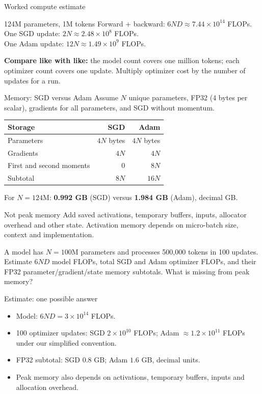 \documentclass[handout]{beamer}
\begin{document}
\begin{frame}{Worked compute estimate}
  \begin{block}{124M parameters, 1M tokens}
    Forward + backward: $6ND\approx 7.44\times10^{14}$ FLOPs.\\[6pt]
    One SGD update: $2N\approx 2.48\times10^8$ FLOPs.\\[6pt]
    One Adam update: $12N\approx 1.49\times10^9$ FLOPs.
  \end{block}
  \vfill
  \textbf{Compare like with like:} the model count covers one million tokens; each optimizer count covers one update. Multiply optimizer cost by the number of updates for a run.
\end{frame}

\begin{frame}{Memory: SGD versus Adam}
  \small
  Assume $N$ unique parameters, FP32 (4 bytes per scalar), gradients for all parameters, and SGD without momentum.
  \vspace{4pt}
  \begin{center}
    \begin{tabular}{lrr}
      \toprule
      Storage & SGD & Adam \\
      \midrule
      Parameters & $4N$ bytes & $4N$ bytes \\
      Gradients & $4N$ & $4N$ \\
      First and second moments & 0 & $8N$ \\
      \midrule
      Subtotal & $8N$ & $16N$ \\
      \bottomrule
    \end{tabular}
  \end{center}
  For $N=124$M: \textbf{0.992 GB} (SGD) versus \textbf{1.984 GB} (Adam), decimal GB.
  \begin{alertblock}{Not peak memory}
    Add saved activations, temporary buffers, inputs, allocator overhead and other state. Activation memory depends on micro-batch size, context and implementation.
  \end{alertblock}
\end{frame}

{A model has $N=100$M parameters and processes 500,000 tokens in 100 updates. Estimate $6ND$ model FLOPs, total SGD and Adam optimizer FLOPs, and their FP32 parameter/gradient/state memory subtotals. What is missing from peak memory?}

\begin{frame}{Estimate: one possible answer}
  \begin{itemize}
      \setlength{\itemsep}{9pt}
    \item Model: $6ND=3\times10^{14}$ FLOPs.
    \item 100 optimizer updates: SGD $2\times10^{10}$ FLOPs; Adam $\approx1.2\times10^{11}$ FLOPs under our simplified convention.
    \item FP32 subtotal: SGD $0.8$ GB; Adam $1.6$ GB, decimal units.
    \item Peak memory also depends on activations, temporary buffers, inputs and allocation overhead.
  \end{itemize}
\end{frame}
\end{document}
